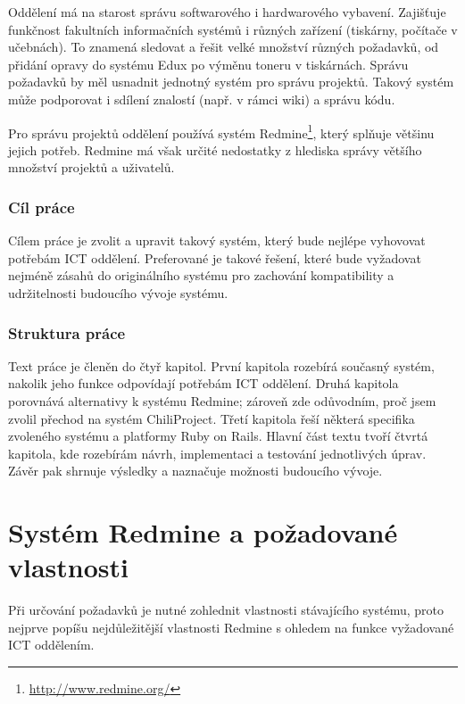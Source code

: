 \documentclass[thesis=B,czech]{FITthesis}[2012/05/02]
\begin{document}
\begin{introduction}

Oddělení   má na starost správu softwarového i hardwarového vybavení. Zajišťuje funkčnost fakultních informačních systémů i různých zařízení (tiskárny, počítače v učebnách). To znamená sledovat a řešit velké množství různých požadavků, od přidání opravy do systému Edux po výměnu toneru v tiskárnách. Správu požadavků by měl usnadnit jednotný systém pro správu projektů. Takový systém může podporovat i sdílení znalostí (např. v rámci \gls{wiki}) a správu kódu.

Pro správu projektů oddělení používá systém Redmine\footnote{\url{http://www.redmine.org/}}, který splňuje většinu jejich potřeb. Redmine má však určité nedostatky z hlediska správy většího množství projektů a uživatelů.

\subsection{Cíl práce}

Cílem práce je zvolit a upravit takový systém, který bude nejlépe vyhovovat potřebám ICT oddělení. Preferované je takové řešení, které bude vyžadovat nejméně zásahů do originálního systému pro zachování kompatibility a udržitelnosti budoucího vývoje systému.

\subsection{Struktura práce}

Text práce je členěn do čtyř kapitol. První kapitola rozebírá současný systém, nakolik jeho funkce odpovídají potřebám ICT oddělení. Druhá kapitola porovnává alternativy k systému Redmine; zároveň zde odůvodním, proč jsem zvolil přechod na systém ChiliProject. Třetí kapitola řeší některá specifika zvoleného systému a platformy Ruby on Rails. Hlavní část textu tvoří čtvrtá kapitola, kde rozebírám návrh, implementaci a testování jednotlivých úprav. Závěr pak shrnuje výsledky a naznačuje možnosti budoucího vývoje.

\end{introduction}

\chapter{Systém Redmine a požadované vlastnosti}

Při určování požadavků je nutné zohlednit vlastnosti stávajícího
systému, proto nejprve popíšu nejdůležitější vlastnosti Redmine
s ohledem na funkce vyžadované ICT oddělením.
\end{document}

